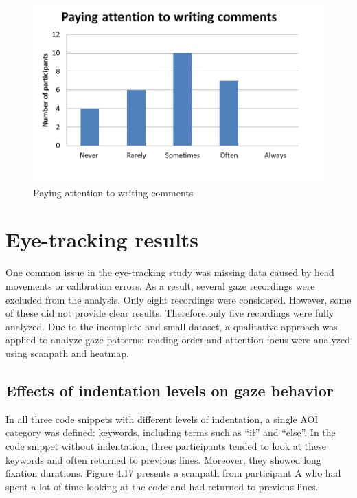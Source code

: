 \begin{figure} [H]
  \centering
  \includegraphics[scale=0.9]{figures/comAt.png}
  \caption{Paying attention to writing comments }
  \label{fig:AnhangsChor}
\end{figure}


\section{Eye-tracking results}
One common issue in the eye-tracking study was missing data caused by head movements or calibration errors. As a result, several gaze recordings were excluded from the analysis. Only eight recordings were considered. However, some of these did not provide clear results. Therefore,only five recordings were fully analyzed. 
Due to the incomplete and small dataset, a qualitative approach was applied to analyze gaze patterns: reading order and attention focus were analyzed using scanpath and heatmap.  
 


\subsection{Effects of indentation levels on gaze behavior}
In all three code snippets with different levels of indentation, a single AOI category was defined: keywords, including terms such as “if” and “else”. In the code snippet without indentation, three participants tended to look at these keywords and often returned to previous lines. Moreover, they showed long fixation durations.  Figure 4.17 presents a scanpath from participant A who had spent a lot of time looking at the code and had returned to previous lines. 

